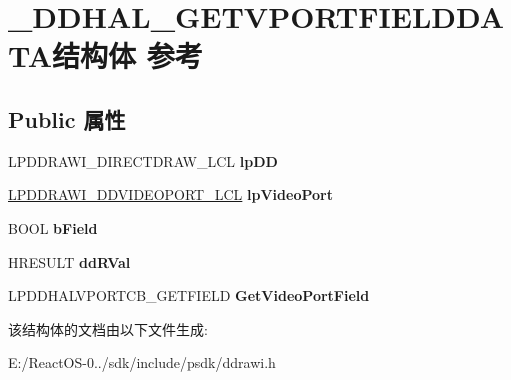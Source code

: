 \hypertarget{struct___d_d_h_a_l___g_e_t_v_p_o_r_t_f_i_e_l_d_d_a_t_a}{}\section{\+\_\+\+D\+D\+H\+A\+L\+\_\+\+G\+E\+T\+V\+P\+O\+R\+T\+F\+I\+E\+L\+D\+D\+A\+T\+A结构体 参考}
\label{struct___d_d_h_a_l___g_e_t_v_p_o_r_t_f_i_e_l_d_d_a_t_a}
\subsection*{Public 属性}
\begin{DoxyCompactItemize}
\item 
\mbox{\label{struct___d_d_h_a_l___g_e_t_v_p_o_r_t_f_i_e_l_d_d_a_t_a_ac10d7f547e931497d5c083778e35c7bc}} 
L\+P\+D\+D\+R\+A\+W\+I\+\_\+\+D\+I\+R\+E\+C\+T\+D\+R\+A\+W\+\_\+\+L\+CL {\bfseries lp\+DD}
\item 
\mbox{\label{struct___d_d_h_a_l___g_e_t_v_p_o_r_t_f_i_e_l_d_d_a_t_a_a4518100ad2410eb02528ee013d107ca8}} 
\hyperlink{struct___d_d_r_a_w_i___d_d_v_i_d_e_o_p_o_r_t___l_c_l}{L\+P\+D\+D\+R\+A\+W\+I\+\_\+\+D\+D\+V\+I\+D\+E\+O\+P\+O\+R\+T\+\_\+\+L\+CL} {\bfseries lp\+Video\+Port}
\item 
\mbox{\label{struct___d_d_h_a_l___g_e_t_v_p_o_r_t_f_i_e_l_d_d_a_t_a_a83721ac3f4449954f37ce11f33686c71}} 
B\+O\+OL {\bfseries b\+Field}
\item 
\mbox{\label{struct___d_d_h_a_l___g_e_t_v_p_o_r_t_f_i_e_l_d_d_a_t_a_a6686952666103f4b492ffe8d12e90127}} 
H\+R\+E\+S\+U\+LT {\bfseries dd\+R\+Val}
\item 
\mbox{\label{struct___d_d_h_a_l___g_e_t_v_p_o_r_t_f_i_e_l_d_d_a_t_a_a57934264f25dc6a735749ef7c3cd47bd}} 
L\+P\+D\+D\+H\+A\+L\+V\+P\+O\+R\+T\+C\+B\+\_\+\+G\+E\+T\+F\+I\+E\+LD {\bfseries Get\+Video\+Port\+Field}
\end{DoxyCompactItemize}


该结构体的文档由以下文件生成\+:\begin{DoxyCompactItemize}
\item 
E\+:/\+React\+O\+S-\/0../sdk/include/psdk/ddrawi.\+h\end{DoxyCompactItemize}
